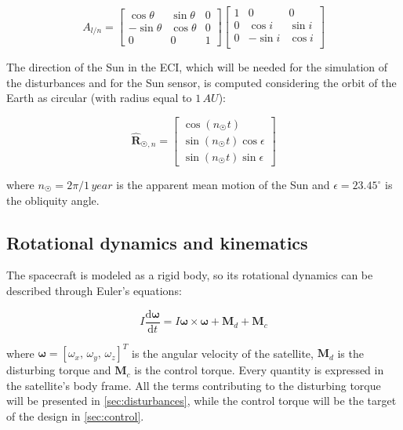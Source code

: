 \begin{equation}
    A_{l/n} = \begin{bmatrix} \cos \theta & \sin \theta & 0 \\
    - \sin \theta & \cos \theta & 0 \\
    0 & 0 & 1
    \end{bmatrix}
    \begin{bmatrix}
    1 & 0 & 0 \\
    0 & \cos i & \sin i \\
    0 & - \sin i & \cos i \\
    \end{bmatrix}
    \label{eq:A_ln}
\end{equation}

The direction of the Sun in the ECI, which will be needed for the simulation of the disturbances and for the Sun sensor, is computed considering the orbit of the Earth as circular (with radius equal to $1 \, AU$):

\begin{equation}
    \hat{\mathbf{R}}_{\Sun,n} = \begin{bmatrix}
    \cos (n_{\Sun} t) \\
    \sin (n_{\Sun} t) \cos \epsilon \\
    \sin (n_{\Sun} t) \sin \epsilon
    \end{bmatrix}
\end{equation}

where $n_{\Sun} = 2 \pi / 1\,year$ is the apparent mean motion of the Sun and $\epsilon = 23.45^{\circ}$ is the obliquity angle.

\subsection{Rotational dynamics and kinematics}

The spacecraft is modeled as a rigid body, so its rotational dynamics can be described through Euler's equations:

\begin{equation}
    I \frac{\mathrm{d} \bm{\omega}}{\mathrm{d} t} = I \bm{\omega} \times \bm{\omega} + \mathbf{M}_d + \mathbf{M}_c
    \label{eq:euler}
\end{equation}

where $\bm{\omega} = [\omega_x,\, \omega_y,\, \omega_z]^T$ is the angular velocity of the satellite, $\mathbf{M}_d$ is the disturbing torque and $\mathbf{M}_c$ is the control torque. Every quantity is expressed in the satellite's body frame. All the terms contributing to the disturbing torque will be presented in \cref{sec:disturbances}, while the control torque will be the target of the design in \cref{sec:control}. 

